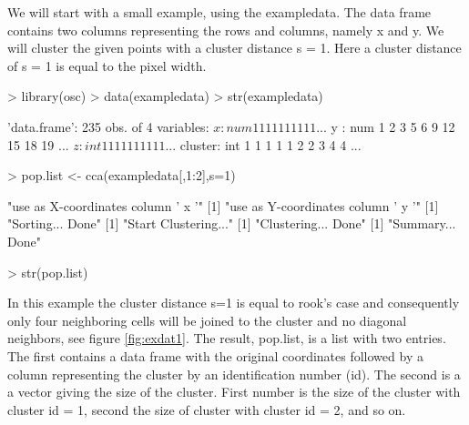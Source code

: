 \documentclass[10pt,a4paper]{article}
\begin{document}
We will start with a small example, using the exampledata. The data frame contains two columns representing the rows and columns, namely x and y. We will cluster the given points with a cluster distance s = 1. Here a cluster distance of s = 1 is equal to the pixel width.
\begin{Schunk}
\begin{Sinput}
> library(osc)
> data(exampledata)
> str(exampledata)
\end{Sinput}
\begin{Soutput}
'data.frame':	235 obs. of  4 variables:
 $ x      : num  1 1 1 1 1 1 1 1 1 1 ...
 $ y      : num  1 2 3 5 6 9 12 15 18 19 ...
 $ z      : int  1 1 1 1 1 1 1 1 1 1 ...
 $ cluster: int  1 1 1 1 1 2 2 3 4 4 ...
\end{Soutput}
\begin{Sinput}
> pop.list <- cca(exampledata[,1:2],s=1)
\end{Sinput}
\begin{Soutput}
[1] "use as X-coordinates column ' x '"
[1] "use as Y-coordinates column ' y '"
[1] "Sorting... Done"
[1] "Start Clustering..."
[1] "Clustering... Done"
[1] "Summary... Done"
\end{Soutput}
\begin{Sinput}
> str(pop.list)
\end{Sinput}
\end{Schunk}

In this example the cluster distance s=1 is equal to rook’s case and consequently only four neighboring cells will be joined to the cluster and no diagonal neighbors, see figure \ref{fig:exdat1}. The result, pop.list, is a list with two entries. The first contains a data frame with the original coordinates followed by a column representing the cluster by an identification number (id). The second is a a vector giving the size of the cluster. First number is the size of the cluster with cluster id = 1, second the size of cluster with cluster id = 2, and so on.
\end{document}
